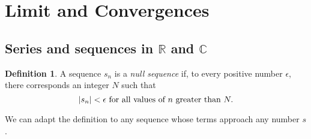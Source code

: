 \documentclass[12pt]{book}
\theoremstyle{definition}
\newtheorem{definition}{Definition}[section]
\theoremstyle{remark}
\DeclarePairedDelimiter\abs{\lvert}{\rvert}
\begin{document}
		\section{Limit and Convergences}
			\subsection{Series and sequences in $\mathbb{R}$ and $\mathbb{C}$}
				\begin{definition}
					A sequence $s_n$ is a \textit{null sequence} if, to every positive number $\epsilon$, there corresponds an integer $N$ such that
					\begin{equation*}
						\abs*{s_n} < \epsilon \text{ for all values of $n$ greater than } N.
					\end{equation*}
				\end{definition}
			
			We can adapt the definition to any sequence whose terms approach any number $s$.
			
\end{document}
